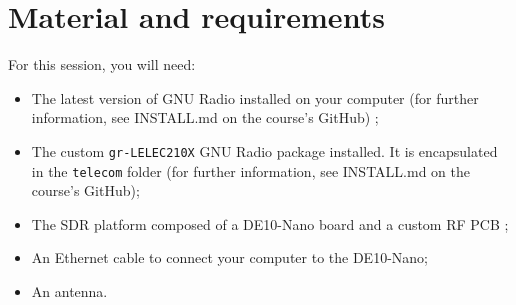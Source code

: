 \section*{Material and requirements}

For this session, you will need:
\begin{itemize}
    \item The latest version of GNU Radio installed on your computer (for further information, see INSTALL.md on the course's GitHub) ;
    \item The custom \texttt{gr-LELEC210X} GNU Radio package installed. It is encapsulated in the \texttt{telecom} folder (for further information, see INSTALL.md on the course's GitHub);
    \item The SDR platform composed of a DE10-Nano board and a custom RF PCB ;
    \item An Ethernet cable to connect your computer to the DE10-Nano;
    \item An antenna.
\end{itemize}
